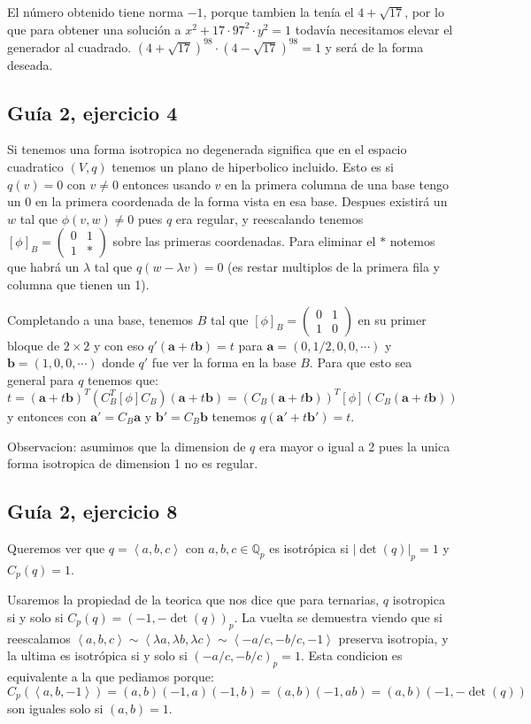 \documentclass[12pt]{amsart}
\newcommand{\QQ}{\mathbb{Q}}
\newcommand{\aaa}{\mathbf{a}}
\newcommand{\bbb}{\mathbf{b}}
\newcommand{\minimat}[4]{\left(\begin{smallmatrix} #1 & #2 \\ #3 & #4 
\end{smallmatrix}\right)}
\newcommand{\lp}{\left(}
\newcommand{\rp}{\right)}
\newcommand{\lc}{\left<}
\newcommand{\rc}{\right>}
\newcommand{\lco}{\left[}
\newcommand{\rco}{\right]}
\theoremstyle{plain}
\begin{document}
El número obtenido tiene norma $-1$, porque tambien la tenía el 
$4+\sqrt{17}$, por lo que para obtener una solución a 
$x^2+17\cdot97^2\cdot y^2 = 1$ todavía necesitamos elevar el generador
al cuadrado. 
\hyperref[solucion25]{$(4+\sqrt{17})^{98}\cdot(4-\sqrt{17})^{98} = 1$} 
y será de la forma deseada.

\subsection*{Guía 2, ejercicio 4}

Si tenemos una forma isotropica no degenerada significa que en el
espacio cuadratico $(V,q)$ tenemos un plano de hiperbolico incluido. 
Esto es si $q(v)=0$ con $v\neq0$ entonces usando $v$ en la primera 
columna de una base tengo un $0$ en la primera coordenada de la forma
vista en esa base. Despues existirá un $w$ tal que $\phi(v,w)\neq0$
pues $q$ era regular, y reescalando tenemos $\lco\phi\rco_B=
\minimat{0}{1}{1}{*}$ sobre las primeras coordenadas. Para eliminar 
el $*$ notemos que habrá un $\lambda$ tal que $q(w-\lambda v)=0$ 
(es restar multiplos de la primera fila y columna que tienen un 1).

Completando a una base, tenemos $B$ tal que $\lco\phi\rco_B=
\minimat{0}{1}{1}{0}$ en su primer bloque de $2\times2$ y con eso 
$q'(\aaa+t\bbb)=t$ para $\aaa=(0,1/2,0,0,\cdots)$ y $\bbb=(1,0,0,
\cdots)$ donde $q'$ fue ver la forma en la base $B$. Para que esto 
sea general para $q$ tenemos que:
$$t=(\aaa +t\bbb )^T \lp C_B^T\lco\phi\rco C_B\rp(\aaa+t\bbb)=
\lp C_B(\aaa+t\bbb)\rp^T\lco\phi\rco \lp C_B(\aaa+t\bbb)\rp$$
y entonces con $\aaa'=C_B\aaa$ y $\bbb'=C_B\bbb$ tenemos $q(\aaa'+
t\bbb')=t$.

Observacion: asumimos que la dimension de $q$ era mayor o igual a 2
pues la unica forma isotropica de dimension 1 no es regular.

\subsection*{Guía 2, ejercicio 8}

Queremos ver que $q = \lc a,b,c\rc $ con $a,b,c \in \QQ_p$ es 
isotrópica si $|\det (q)|_p =1$ y $C_p(q) = 1$.

Usaremos la propiedad de la teorica que nos dice que para ternarias,
$q$ isotropica si y solo si $C_p(q)=(-1,-\det (q))_p$. La vuelta se 
demuestra viendo que si reescalamos $\lc a,b,c\rc \sim \lc\lambda a,
\lambda b,\lambda c\rc \sim \lc-a/c,-b/c,-1\rc$ preserva isotropia, 
y la ultima es isotrópica si y solo si $(-a/c,-b/c)_p = 1$. 
Esta condicion es equivalente a la que pediamos porque:
$$C_p(\lc a,b,-1\rc) = (a,b)(-1,a)(-1,b)=(a,b)(-1,ab)=(a,b)
(-1,-\det(q))$$ son iguales solo si $(a,b)=1$.
\end{document}
